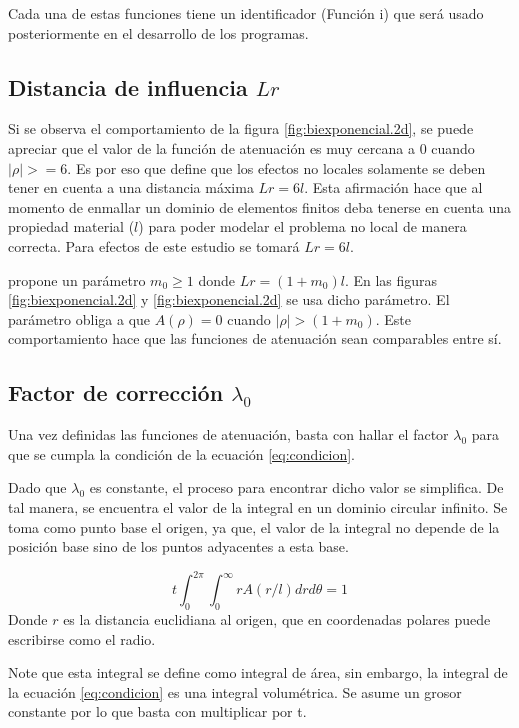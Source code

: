 Cada una de estas funciones tiene un identificador (Función i) que será usado posteriormente en el desarrollo de los programas.
\subsection{Distancia de influencia \texorpdfstring{$Lr$}{Lr}}

Si se observa el comportamiento de la figura \ref{fig:biexponencial.2d}, se puede apreciar que el valor de la función de atenuación es muy cercana a 0 cuando $|\rho|>=6$. Es por eso que \textcite{Polizzotto2001} define que los efectos no locales solamente se deben tener en cuenta a una distancia máxima $Lr=6l$. Esta afirmación hace que al momento de enmallar un dominio de elementos finitos deba tenerse en cuenta una propiedad material ($l$) para poder modelar el problema no local de manera correcta. Para efectos de este estudio se tomará $Lr=6l$. 

\textcite{Polizzotto2001} propone un parámetro $m_0\geq1$ donde $Lr=(1+m_0)l$. En las figuras \ref{fig:biexponencial.2d} y \ref{fig:biexponencial.2d} se usa dicho parámetro. El parámetro obliga a que $A(\rho)=0$ cuando $|\rho|>(1+m_0)$. Este comportamiento hace que las funciones de atenuación sean comparables entre sí.

\subsection{Factor de corrección \texorpdfstring{$\lambda_0$}{λ0}}

Una vez definidas las funciones de atenuación, basta con hallar el factor $\lambda_0$ para que se cumpla la condición de la ecuación \ref{eq:condicion}.

Dado que $\lambda_0$ es constante, el proceso para encontrar dicho valor se simplifica. De tal manera, se encuentra el valor de la integral en un dominio circular infinito. Se toma como punto base el origen, ya que, el valor de la integral no depende de la posición base sino de los puntos adyacentes a esta base.

\begin{equation}
	t\int_{0}^{2\pi}\int_{0}^{\infty}{rA(r/l)}{dr}{d\theta}=1
\end{equation} 
Donde $r$ es la distancia euclidiana al origen, que en coordenadas polares puede escribirse como el radio.

Note que esta integral se define como integral de área, sin embargo, la integral de la ecuación \ref{eq:condicion} es una integral volumétrica. Se asume un grosor constante por lo que basta con multiplicar por t.

